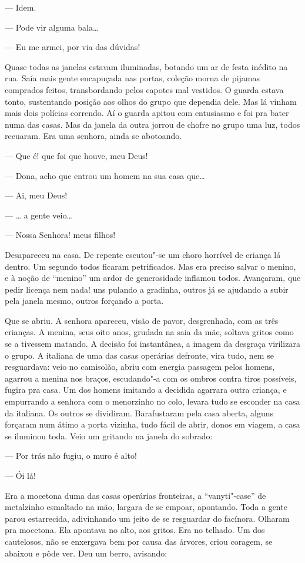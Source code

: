 --- Idem.

--- Pode vir alguma bala\ldots{}

--- Eu me armei, por via das dúvidas!

Quase todas as janelas estavam iluminadas, botando um ar de festa
inédito na rua. Saía mais gente encapuçada nas portas, coleção morna de
pijamas comprados feitos, transbordando pelos capotes mal vestidos. O
guarda estava tonto, sustentando posição aos olhos do grupo que dependia
dele. Mas lá vinham mais dois polícias correndo. Aí o guarda apitou com
entusiasmo e foi pra bater numa das casas. Mas da janela da outra jorrou
de chofre no grupo uma luz, todos recuaram. Era uma senhora, ainda se
abotoando.

--- Que é! que foi que houve, meu Deus!

--- Dona, acho que entrou um homem na sua casa que\ldots{}

--- Ai, meu Deus!

--- \ldots{} a gente veio\ldots{}

--- Nossa Senhora! meus filhos!

Desapareceu na casa. De repente escutou"-se um choro horrível de criança
lá dentro. Um segundo todos ficaram petrificados. Mas era preciso salvar
o menino, e à noção de ``menino'' um ardor de generosidade inflamou
todos. Avançaram, que pedir licença nem nada! uns pulando a gradinha,
outros já se ajudando a subir pela janela mesmo, outros forçando a
porta.

Que se abriu. A senhora apareceu, visão de pavor, desgrenhada, com as
três crianças. A menina, seus oito anos, grudada na saia da mãe, soltava
gritos como se a tivessem matando. A decisão foi instantânea, a imagem
da desgraça virilizara o grupo. A italiana de uma das casas operárias
defronte, vira tudo, nem se resguardava: veio no camisolão, abriu com
energia passagem pelos homens, agarrou a menina nos braços, escudando"-a
com os ombros contra tiros possíveis, fugira pra casa. Um dos homens
imitando a decidida agarrara outra criança, e empurrando a senhora com o
menorzinho no colo, levara tudo se esconder na casa da italiana. Os
outros se dividiram. Barafustaram pela casa aberta, alguns forçaram num
átimo a porta vizinha, tudo fácil de abrir, donos em viagem, a casa se
iluminou toda. Veio um gritando na janela do sobrado:

--- Por trás não fugiu, o muro é alto!

--- Ói lá!

Era a mocetona duma das casas operárias fronteiras, a ``vanyti"-case'' de
metalzinho esmaltado na mão, largara de se empoar, apontando. Toda a
gente parou estarrecida, adivinhando um jeito de se resguardar do
facínora. Olharam pra mocetona. Ela apontava no alto, aos gritos. Era no
telhado. Um dos cautelosos, não se enxergava bem por causa das árvores,
criou coragem, se abaixou e pôde ver. Deu um berro, avisando:

